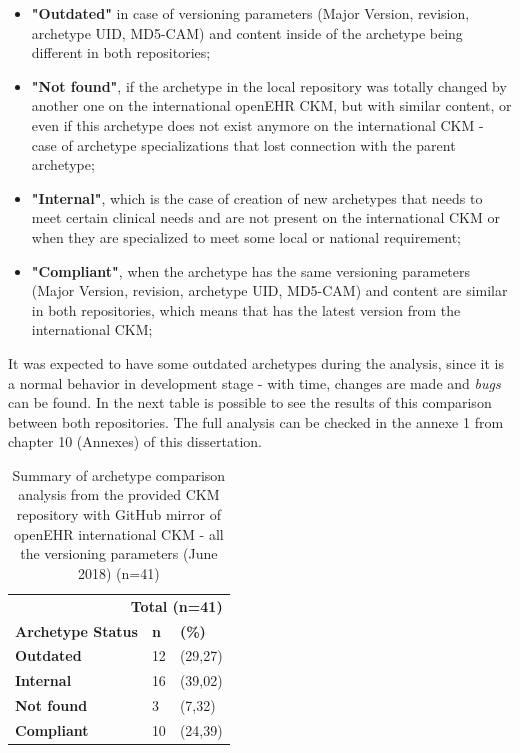 \documentclass[mim_thesis.tex]{subfiles}
\begin{document}
\begin{itemize}[noitemsep]
\item \textbf{"Outdated"} in case of versioning parameters (Major Version, revision, archetype UID, MD5-CAM) and content inside of the archetype being different in both repositories;
\item \textbf{"Not found"}, if the archetype in the local repository was totally changed by another one on the international openEHR CKM, but with similar content, or even if this archetype does not exist anymore on the international CKM - case of archetype specializations that lost connection with the parent archetype;
\item \textbf{"Internal"}, which is the case of creation of new archetypes that needs to meet certain clinical needs and are not present on the international CKM or when they are specialized to meet some local or national requirement;
\item \textbf{"Compliant"}, when the archetype has the same versioning parameters (Major Version, revision, archetype UID, MD5-CAM) and content are similar in both repositories, which means that has the latest version from the international CKM;
\end{itemize}

It was expected to have some outdated archetypes during the analysis, since it is a normal behavior in development stage - with time, changes are made and \textit{bugs} can be found. In the next table is possible to see the results of this comparison between both repositories. The full analysis can be checked in the annexe 1 from chapter 10 (Annexes) of this dissertation.

\begin{table}[H]
	\centering
	\caption{Summary of archetype comparison analysis from the provided CKM repository with GitHub mirror of openEHR international CKM - all the versioning parameters (June 2018) (n=41)}
	\label{tab:repos_comp}
	\begin{tabular}{lll}
		\toprule[2pt]
		\multicolumn{3}{r}{\textbf{ Total (n=41) }} \\
		\cmidrule(r){2-3}
		\textbf{Archetype Status}   & \textbf{n} & \textbf{(\%)} \\
		\midrule[2pt]
		\textbf{Outdated } & 12 & (29,27) \\
		\midrule
		\textbf{Internal } & 16 & (39,02) \\
		\midrule
		\textbf{Not found } & 3 & (7,32) \\
        \midrule
		\textbf{Compliant } & 10 & (24,39) \\
		\bottomrule[2pt]
	\end{tabular}
\end{table}
\end{document}
